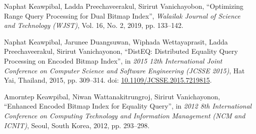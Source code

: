 \documentclass[../main/thesis.tex]{subfiles}
\begin{document}
\begin{vitae}
{\begin{pubItem}
			\item Naphat Keawpibal, Ladda Preechaveerakul, Sirirut Vanichayobon, ``Optimizing Range Query Processing for Dual Bitmap Index'', \textit{Walailak Journal of Science and Technology (WJST)}, Vol. 16, No. 2, 2019, pp. 133--142.
		\end{pubItem}
	}

	{
		\begin{pubItem}
			\item Naphat Keawpibal, Jarunee Duangsuwan, Wiphada Wettayaprasit, Ladda Preechaveerakul, Sirirut Vanichayonon, ``DistEQ: Distributed Equality Query Processing on Encoded Bitmap Index'', in \textit{2015 12th International Joint Conference on Computer Science and Software Engineering (JCSSE 2015)},
			Hat Yai, Thailand, 2015, pp. 309--314. doi: \href{https://doi.org/10.1109/JCSSE.2015.7219815}{10.1109/JCSSE.2015.7219815}.
			
			\item Amorntep Keawpibal, Niwan Wattanakitrungroj, Sirirut Vanichayonon,
			``Enhanced Encoded Bitmap Index for Equality Query'', in \textit{2012 8th International Conference on Computing Technology and Information Management (NCM and ICNIT)}, Seoul, South Korea, 2012, pp. 293--298.
		\end{pubItem}
	}

\end{vitae}
\end{document}

